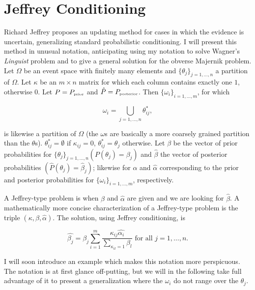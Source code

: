 \documentclass[11pt]{article}
\begin{document}
\section{Jeffrey Conditioning}
\label{jc}

Richard Jeffrey proposes an updating method for cases in which the
evidence is uncertain, generalizing standard probabilistic
conditioning. I will present this method in unusual notation,
anticipating using my notation to solve Wagner's \emph{Linguist}
problem and to give a general solution for the obverse Majernik
problem. Let $\Omega$ be an event space with finitely many elements
and $\{\theta_{j}\}_{j=1,\ldots,n}$ a partition of $\Omega$. Let
$\kappa$ be an $m\times{}n$ matrix for which each column contains
exactly one $1$, otherwise $0$. Let $P=P_{\mbox{\tiny{prior}}}$ and
$\hat{P}=P_{\mbox{\tiny{posterior}}}$. Then
$\{\omega_{i}\}_{i=1,\ldots,m}$, for which

\begin{equation}
  \label{eq:m1}
  \omega_{i}=\bigcup_{j=1,\dots,n}\theta^{*}_{ij},
\end{equation}

is likewise a partition of $\Omega$ (the $\omega$s are basically a
more coarsely grained partition than the $\theta$s).
$\theta^{*}_{ij}=\emptyset$ if $\kappa_{ij}=0$,
$\theta^{*}_{ij}=\theta_{j}$ otherwise. Let $\beta$ be the vector of
prior probabilities for $\{\theta_{j}\}_{j=1,\ldots,n}
(P(\theta_{j})=\beta_{j})$ and $\hat{\beta}$ the vector of posterior
probabilities $(\hat{P}(\theta_{j})=\hat{\beta}_{j})$; likewise for
$\alpha$ and $\hat{\alpha}$ corresponding to the prior and posterior
probabilities for $\{\omega_{i}\}_{i=1,\ldots,m}$, respectively.

A Jeffrey-type problem is when $\beta$ and $\hat{\alpha}$ are given
and we are looking for $\hat{\beta}$. A mathematically more concise
characterization of a Jeffrey-type problem is the triple
$(\kappa,\beta,\hat{\alpha})$. The solution, using Jeffrey
conditioning, is

\begin{equation}
  \label{eq:m2}
  \hat{\beta_{j}}=\beta_{j}\sum_{i=1}^{m}\frac{\kappa_{ij}\hat{\alpha_{i}}}{\sum_{\kappa_{il}=1}\beta_{l}}\mbox{ for all }j=1,\ldots,n.
\end{equation}

I will soon introduce an example which makes this notation more
perspicuous. The notation is at first glance off-putting, but we will
in the following take full advantage of it to present a generalization
where the $\omega_{i}$ do not range over the $\theta_{j}$.
\end{document}
